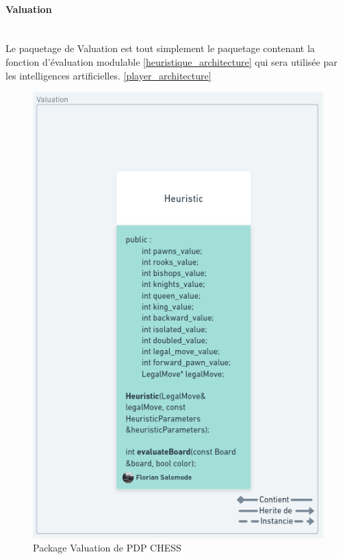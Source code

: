 \huge\documentclass{article}
\begin{document}
    \paragraph{Valuation}
    ~~\\
    \newline
    Le paquetage de Valuation est tout simplement le paquetage contenant la fonction d'évaluation modulable \ref{heuristique_architecture}
    qui sera utilisée par les intelligences artificielles. \ref{player_architecture}
    \begin{figure}[!h]
        \centering
        \includegraphics[scale = 0.3]{img/Package/Valuation.png}
        \caption{Package Valuation de PDP CHESS}
        \label{pck:valuation}
    \end{figure}

    \newpage
\end{document}
